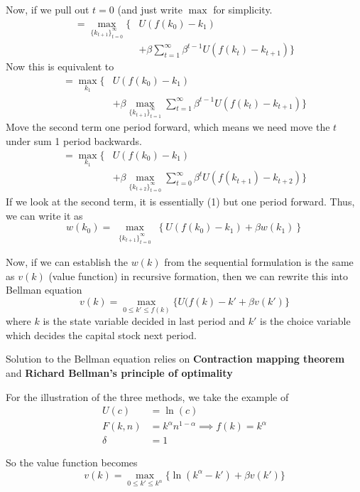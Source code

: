 \documentclass[twocolumn, fleqn]{article}
\begin{document}
	Now, if we pull out $t=0$ (and just write $\max$ for simplicity.
	\begin{align*}
    	=\max_{\{k_{t+1}\}_{t=0}^\infty} 
    	\lbrace 
        &U(f(k_0) - k_1)
        \\
        &+ \beta \sum_{t=1}^\infty \beta^{t-1} U(f(k_t) - k_{t+1}) 
    	\rbrace
	\end{align*}
	Now this is equivalent to 
	\begin{align*}
    	=\max_{k_{1}} 
    	\lbrace 
        &U(f(k_0) - k_1)
        \\
        &+ \beta \max_{\{k_{t+1}\}_{t=1}^\infty} \sum_{t=1}^\infty \beta^{t-1} U(f(k_t) - k_{t+1}) 
    	\rbrace
	\end{align*}	
	Move the second term one period forward, which means we need move the $t$ under sum 1 period backwards.
		\begin{align*}
    	=\max_{k_{1}} 
    	\lbrace 
        &U(f(k_0) - k_1)
        \\
        &+ \beta \max_{\{k_{t+2}\}_{t=0}^\infty} \sum_{t=0}^\infty \beta^{t} U(f(k_{t+1}) - k_{t+2}) 
    	\rbrace
	\end{align*}
	If we look at the second term, it is essentially (1) but one period forward. Thus, we can write it as 
	\[
		w(k_0) = \max_{\substack{\{k_{t+1}\}_{t=0}^{\infty}}} \left\lbrace U(f(k_0) - k_1) + \beta w(k_1) \right\rbrace
	\]
	
	Now, if we can establish the $w(k)$ from the sequential formulation is the same as $v(k)$ (value function) in recursive formation, then we can rewrite this into Bellman equation
	\[
	v(k) = \max_{0\leq k'\leq f(k)} \{U(f(k)-k'+\beta v(k')\}
	\]
	where $k$ is the state variable decided in last period and $k'$ is the choice variable which decides the capital stock next period.
	
	Solution to the Bellman equation relies on \textbf{Contraction mapping theorem} and \textbf{Richard Bellman's principle of optimality}
	
		For the illustration of the three methods, we take the example of 
	\begin{align*}
		U(c) &= \ln(c)\\
		F(k,n) &= k^\alpha n^{1-\alpha} \implies f(k)  = k^\alpha\\
		\delta &= 1
	\end{align*}
	
	So the value function becomes 
	\[v(k) = \max_{0\leq k' \leq k^\alpha} \{ \ln (k^\alpha - k') + \beta v(k')\}\]
	
\end{document}
